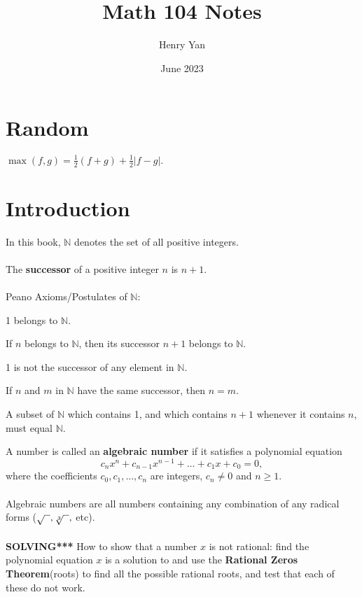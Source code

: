 \documentclass{article}
\title{Math 104 Notes}
\author{Henry Yan}
\date{June 2023}
\theoremstyle{definition}
\begin{document}
\maketitle

\section*{Random}
$\max(f, g) = \frac{1}{2} (f + g) + \frac{1}{2}|f - g|.$ 
\section*{Introduction}
In this book, $\mathbb{N}$ denotes the set of all positive integers. \\ \\
The \textbf{successor} of a positive integer $n$ is $n + 1$. \\ \\
Peano Axioms/Postulates of $\mathbb{N}$: \begin{NList}
    \item 1 belongs to $\mathbb{N}$.
    \item If $n$ belongs to $\mathbb{N}$, then its successor $n + 1$ belongs to $\mathbb{N}$.
    \item 1 is not the successor of any element in $\mathbb{N}$.
    \item If $n$ and $m$ in $\mathbb{N}$ have the same successor, then $n = m$.
    \item A subset of $\mathbb{N}$ which contains 1, and which contains $n + 1$ whenever it contains $n$, must equal $\mathbb{N}$.
\end{NList} $ $ \\
A number is called an \textbf{algebraic number} if it satisfies a polynomial equation $$c_nx^n + c_{n - 1}x^{n - 1} + \dots + c_1x + c_0 = 0,$$ where the coefficients $c_0, c_1, \dots, c_n$ are integers, $c_n \neq 0$ and $n \geq 1$. \\ \\
Algebraic numbers are all numbers containing any combination of any radical forms ($\sqrt{\hspace{2mm}}, \sqrt[3]{\hspace{2mm}},$ etc). \\ \\
\textbf{SOLVING***} How to show that a number $x$ is not rational: find the polynomial equation $x$ is a solution to and use the \textbf{Rational Zeros Theorem}(roots) to find all the possible rational roots, and test that each of these do not work. \\ \\
\end{document}
